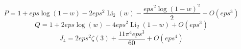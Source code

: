 \[P=1 + eps \log{\left(1 - w \right)} - 2 eps^{2} \operatorname{Li}_{2}\left(w\right) - \frac{eps^{2} \log{\left(1 - w \right)}^{2}}{2} + O\left(eps^{3}\right)\]
\[Q=1 + 2 eps \log{\left(w \right)} - 4 eps^{2} \operatorname{Li}_{2}\left(1 - w\right) + O\left(eps^{3}\right)\]
\[J_4=2 eps^{2} \zeta\left(3\right) + \frac{11 \pi^{4} eps^{3}}{60} + O\left(eps^{4}\right)\]

